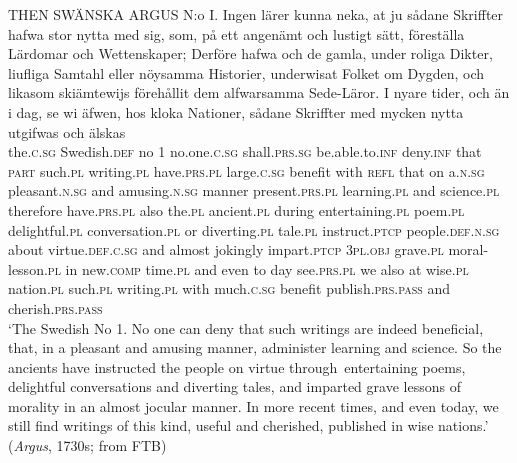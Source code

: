 \documentclass[output=paper]{langscibook}
\begin{document}
\ea        \label{ex:intro:3}
\gll  THEN   SWÄNSKA     ARGUS   N:o I.     Ingen         lärer  kunna         neka,     at     ju       sådane   Skriffter hafwa         stor       nytta     med   sig,   som,   på   ett     angenämt   och lustigt         sätt,     föreställa       Lärdomar   och Wettenskaper;   Derföre hafwa         och de     gamla,     under   roliga         Dikter, liufliga       Samtahl         eller   nöysamma   Historier, underwisat Folket           om   Dygden,        och   likasom   skiämtewijs   förehållit dem       alfwarsamma   Sede-Läror.      I  nyare       tider,    och   än     i   dag, se             wi   äfwen, hos kloka     Nationer,   sådane   Skriffter med   mycken     nytta       utgifwas         och   älskas\\
  the.\textsc{c.sg}   Swedish\textsc{.def}    no 1  no.one.\textsc{c.sg}   shall\textsc{.prs.sg} be.able.to.\textsc{inf}  deny.\textsc{inf}   that   \textsc{part}  such.\textsc{pl}  writing.\textsc{pl}  have.\textsc{prs.pl}   large.\textsc{c.sg}  benefit  with  \textsc{refl}  that  on    a.\textsc{n.sg}  pleasant.\textsc{n.sg}  and amusing.\textsc{n.sg}   manner  present.\textsc{prs.pl}    learning.\textsc{pl}  and science.\textsc{pl}    therefore have.\textsc{prs.pl}   also the.\textsc{pl}  ancient\textsc{.pl}  during  entertaining.\textsc{pl}  poem.\textsc{pl} delightful.\textsc{pl}  conversation.\textsc{pl}   or    diverting.\textsc{pl}  tale.\textsc{pl}  instruct.\textsc{ptcp} people.\textsc{def.n.sg}  about  virtue.\textsc{def.c.sg}  and  almost  jokingly    impart.\textsc{ptcp} \textsc{3pl.obj}  grave.\textsc{pl}      moral-lesson\textsc{.pl}  in   new.\textsc{comp}  time.\textsc{pl}  and  even to   day see.\textsc{prs.pl}   we   also     at  wise.\textsc{pl}  nation.\textsc{pl}  such.\textsc{pl}   writing.\textsc{pl} with   much\textsc{.c.sg}   benefit   publish.\textsc{prs.pass}   and  cherish.\textsc{prs.pass}\\
\glt ‘The Swedish  No 1. No one can deny that such writings are indeed beneficial, that, in a pleasant and amusing manner, administer learning and science. So the ancients have instructed the people on virtue through~entertaining poems, delightful conversations and diverting tales, and imparted grave lessons of morality in an almost jocular manner. In more recent times, and even today, we still find writings of this kind, useful and cherished, published in wise nations.’ (\textit{Argus}, 1730s; from FTB)
\z
\end{document}
